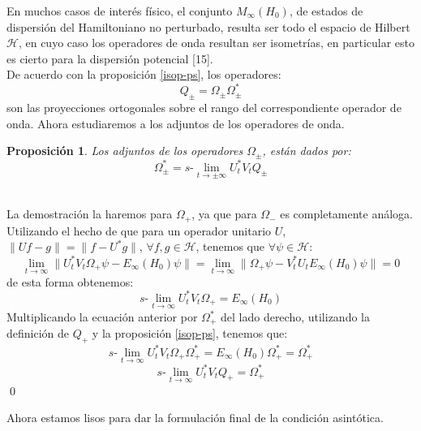 \documentclass[12pt]{book}
\numberwithin{equation}{chapter}
\newtheorem{proposition}[theorem]{Proposici\'on}
\def\n{\noindent}
\def\rar{\rightarrow}
\def\H{\mathcal{H}}
\def\O{\Omega}
\def\slim{s\mbox{-}\lim}
\begin{document}
En muchos casos de inter\'es f\'isico, el conjunto $M_{\infty}(H_{0})$, de estados de dispersi\'on del Hamiltoniano no perturbado, resulta ser todo el espacio de Hilbert $\H$, en cuyo caso los operadores de onda resultan ser isometr\'ias, en particular esto es cierto para la dispersi\'on potencial [15].\\

De acuerdo con la proposici\'on \ref{isop-ps}, los operadores:
\begin{equation}
Q_{\pm} = \O_{\pm} \O_{\pm}^{*}
\end{equation}
son las proyecciones ortogonales sobre el rango del correspondiente operador de onda. Ahora estudiaremos a los adjuntos de los operadores de onda.

\begin{proposition}
Los adjuntos de los operadores $\O_{\pm}$, est\'an dados por:
\begin{equation}
\O_{\pm}^{*} = \slim_{t \rar \pm \infty} U_{t}^{*} V_{t} Q_{\pm}
\end{equation}
\end{proposition}
\n {\bf Demostraci\'on}\\
La demostraci\'on la haremos para $\O_{+}$, ya que para $\O_{-}$ es completamente an\'aloga.\\
Utilizando el hecho de que para un operador unitario $U$, $\| Uf-g \|= \| f-U^{*}g \|$, $\forall f,g \in \H$, tenemos que $\forall \psi \in \H$:
$$ \lim_{t \rar \infty} \| U_{t}^{*}V_{t} \O_{+} \psi - E_{\infty}(H_{0}) \psi \|= \lim_{t \rar \infty} \| \O_{+} \psi - V_{t}^{*}U_{t} E_{\infty}(H_{0}) \psi \|=0 $$
de esta forma obtenemos:
\begin{equation}
\slim_{t \rar \infty} U_{t}^{*}V_{t}\O_{+}= E_{\infty}(H_{0})
\end{equation}
Multiplicando la ecuaci\'on anterior por $\O_{+}^{*}$ del lado derecho, utilizando la definici\'on de $Q_{+}$ y la proposici\'on \ref{isop-ps}, tenemos que:
$$ \slim_{t \rar \infty} U_{t}^{*}V_{t}\O_{+} \O_{+}^{*}= E_{\infty}(H_{0}) \O_{+}^{*} = \O_{+}^{*} $$
\begin{equation}
\slim_{t \rar \infty} U_{t}^{*}V_{t} Q_{+}= \O_{+}^{*}
\end{equation}
\qed

\newpage
 
Ahora estamos lisos para dar la formulaci\'on final de la condici\'on asint\'otica.
\end{document}
